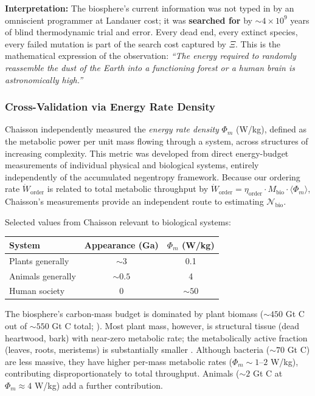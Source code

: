 \documentclass[11pt]{article}
\theoremstyle{plain}
\theoremstyle{definition}
\theoremstyle{remark}
\newcounter{none}
\let\origsubsubsection\subsubsection
\renewcommand{\subsubsection}{\needspace{4\baselineskip}\origsubsubsection}
\begin{document}
\textbf{Interpretation:} The biosphere's current information was not
typed in by an omniscient programmer at Landauer cost; it was
\textbf{searched for} by \(\sim 4 \times 10^9\) years of blind
thermodynamic trial and error. Every dead end, every extinct species,
every failed mutation is part of the search cost captured by \(\Xi\).
This is the mathematical expression of the observation: \emph{``The
energy required to randomly reassemble the dust of the Earth into a
functioning forest or a human brain is astronomically high.''}

\subsubsection{Cross-Validation via Energy Rate
Density}\label{cross-validation-via-energy-rate-density}

Chaisson \citetext{\citeyear{Chaisson2001}; \citeyear{Chaisson2011}}
independently measured the \emph{energy rate density} \(\Phi_m\) (W/kg),
defined as the metabolic power per unit mass flowing through a system,
across structures of increasing complexity. This metric was developed
from direct energy-budget measurements of individual physical and
biological systems, entirely independently of the accumulated negentropy
framework. Because our ordering rate \(\dot{W}_{\text{order}}\) is
related to total metabolic throughput by
\(\dot{W}_{\text{order}} = \eta_{\text{order}} \cdot M_{\text{bio}} \cdot \langle \Phi_m \rangle\),
Chaisson's measurements provide an independent route to estimating
\(\mathcal{N}_{\text{bio}}\).

Selected values from Chaisson \citeyearpar[Table 1]{Chaisson2011}
relevant to biological systems:

{\def\LTcaptype{none} %
\begin{longtable}[]{@{}lcc@{}}
\toprule\noalign{}
System & Appearance (Ga) & \(\Phi_m\) (W/kg) \\
\midrule\noalign{}
\endhead
\bottomrule\noalign{}
\endlastfoot
Plants generally & \(\sim 3\) & 0.1 \\
Animals generally & \(\sim 0.5\) & 4 \\
Human society & 0 & \(\sim 50\) \\
\end{longtable}
}

The biosphere's carbon-mass budget is dominated by plant biomass
(\({\sim}450\) Gt C out of \({\sim}550\) Gt C total;
\citeyearpar{BarOn2018}). Most plant mass, however, is structural tissue
(dead heartwood, bark) with near-zero metabolic rate; the metabolically
active fraction (leaves, roots, meristems) is substantially smaller
\citeyearpar{BarOn2018}. Although bacteria (\({\sim}70\) Gt C) are less
massive, they have higher per-mass metabolic rates
(\(\Phi_m \sim 1\)--\(2\) W/kg), contributing disproportionately to
total throughput. Animals (\({\sim}2\) Gt C at \(\Phi_m \approx 4\)
W/kg) add a further contribution.
\end{document}
